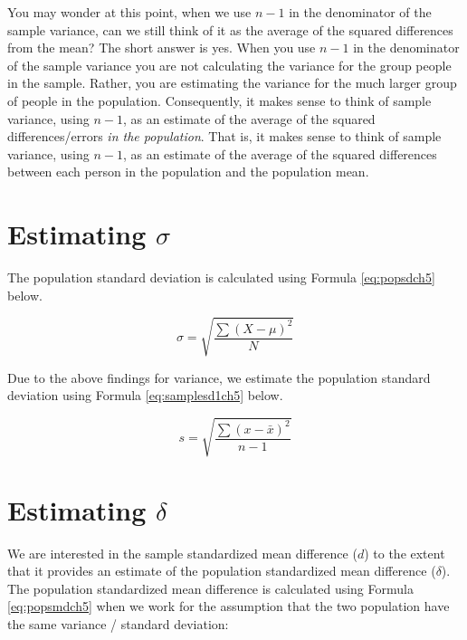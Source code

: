 \documentclass[
]{krantz}
\begin{document}
You may wonder at this point, when we use \(n-1\) in the denominator of the sample variance, can we still think of it as the average of the squared differences from the mean? The short answer is yes. When you use \(n-1\) in the denominator of the sample variance you are not calculating the variance for the group people in the sample. Rather, you are estimating the variance for the much larger group of people in the population. Consequently, it makes sense to think of sample variance, using \(n-1\), as an estimate of the average of the squared differences/errors \emph{in the population}. That is, it makes sense to think of sample variance, using \(n-1\), as an estimate of the average of the squared differences between each person in the population and the population mean.

\hypertarget{estimating-sigma}{%
\section{\texorpdfstring{Estimating \(\sigma\)}{Estimating \textbackslash sigma}}\label{estimating-sigma}}

The population standard deviation is calculated using Formula \eqref{eq:popsdch5} below.

\begin{equation} 
\sigma = \sqrt{\frac{\sum{(X- \mu)^2}}{N}}
      \label{eq:popsdch5}
\end{equation}

Due to the above findings for variance, we estimate the population standard deviation using Formula \eqref{eq:samplesd1ch5} below.

\begin{equation} 
s = \sqrt{\frac{\sum{(x - \bar{x})^2}}{n-1}}
      \label{eq:samplesd1ch5}
\end{equation}

\hypertarget{estimating-delta}{%
\section{\texorpdfstring{Estimating \(\delta\)}{Estimating \textbackslash delta}}\label{estimating-delta}}

We are interested in the sample standardized mean difference (\(d\)) to the extent that it provides an estimate of the population standardized mean difference (\(\delta\)). The population standardized mean difference is calculated using Formula \eqref{eq:popsmdch5} when we work for the assumption that the two population have the same variance / standard deviation:
\end{document}
